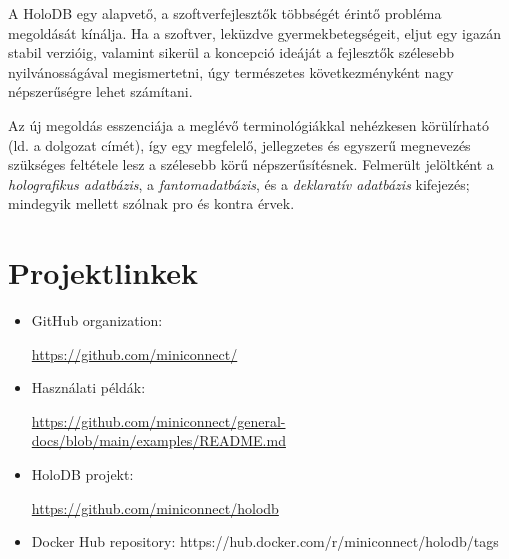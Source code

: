 \documentclass[
    parspace,
    noindent,
    nohyp,
]{elteiktdk}[2023/04/10]
\begin{document}
A HoloDB egy alapvető, a szoftverfejlesztők többségét érintő probléma megoldását kínálja.
Ha a szoftver, leküzdve gyermekbetegségeit, eljut egy igazán stabil verzióig,
valamint sikerül a koncepció ideáját a fejlesztők szélesebb nyilvánosságával megismertetni,
úgy természetes következményként nagy népszerűségre lehet számítani.

Az új megoldás esszenciája a meglévő terminológiákkal nehézkesen körülírható (ld. a dolgozat címét),
így egy megfelelő, jellegzetes és egyszerű megnevezés
szükséges feltétele lesz a szélesebb körű népszerűsítésnek.
Felmerült jelöltként
a \textit{holografikus adatbázis},
a \textit{fantomadatbázis},
és a \textit{deklaratív adatbázis} kifejezés;
mindegyik mellett szólnak pro és kontra érvek.

\pagebreak

\appendix

{}
\printbibliography[title=\biblabel]
\cleardoublepage

{}
\listoffigures
\cleardoublepage

{}
\listoftables
\cleardoublepage

\chapter{Projektlinkek}

\begin{itemize}
    \item GitHub organization: \par \url{https://github.com/miniconnect/}
    \item Használati példák: \par \url{https://github.com/miniconnect/general-docs/blob/main/examples/README.md}
    \item HoloDB projekt: \par \url{https://github.com/miniconnect/holodb}
    \item Docker Hub repository: {https://hub.docker.com/r/miniconnect/holodb/tags}
\end{itemize}
\end{document}

